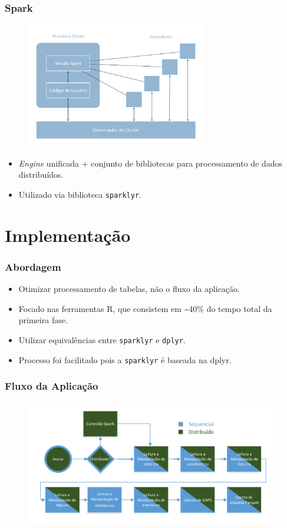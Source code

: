 \documentclass{beamer}
\begin{document}
\begin{frame}
 \frametitle{Spark}
 \begin{figure}[ht]
  \centerline{\includegraphics[width=0.7\textwidth]{./img/spark-arch.pdf}}
  \end{figure}
  \begin{itemize}
  \item \textit{Engine} unificada + conjunto de bibliotecas para processamento 
de dados distribuídos.
  \item Utilizado via biblioteca \texttt{sparklyr}.
  \end{itemize}
\end{frame}


\section{Implementação}
\begin{frame}
 \frametitle{Abordagem}
 \begin{itemize}
  \item Otimizar processamento de tabelas, não o fluxo da aplicação.
  \item Focado nas ferramentas R, que consistem em \textasciitilde 40\% do 
tempo total da primeira fase.
  \item Utilizar equivalências entre \texttt{sparklyr} e \texttt{dplyr}.
  \item Processo foi facilitado pois a \texttt{sparklyr} é baseada na {dplyr}.
 \end{itemize}
\end{frame}

\begin{frame}
 \frametitle{Fluxo da Aplicação}
 \begin{figure}[H]
 \centerline{\includegraphics[width=1\textwidth]{./img/applicationflow.pdf}}
 \end{figure}
\end{frame}
\end{document}
